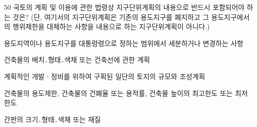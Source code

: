 \begin{question}{50}
국토의 계획 및 이용에 관한 법령상 지구단위계획의 내용으로 반드시 포함되어야 하는 것은? (단, 여기서의 지구단위계획은 기존의 용도지구를 폐지하고 그 용도지구에서의 행위제한을 대체하는 사항을 내용으로 하는 지구단위계획이 아니다.)
\begin{choices}
  \item 용도지역이나 용도지구를 대통령령으로 정하는 범위에서 세분하거나 변경하는 사항
  \item 건축물의 배치․형태․색채 또는 건축선에 관한 계획
  \item 계획적인 개발ㆍ정비를 위하여 구획된 일단의 토지의 규모와 조성계획
  \item 건축물의 용도제한, 건축물의 건폐율 또는 용적률, 건축물 높이의 최고한도 또는 최저한도
  \item 간판의 크기․형태․색채 또는 재질
\end{choices}
\end{question}
